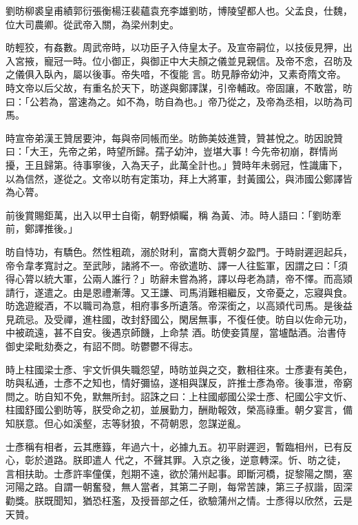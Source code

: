 
\begin{pinyinscope}

 劉昉柳裘皇甫績郭衍張衡楊汪裴蘊袁充李雄劉昉，博陵望都人也。父孟良，仕魏，位大司農卿。從武帝入關，為梁州刺史。



 昉輕狡，有姦數。周武帝時，以功臣子入侍皇太子。及宣帝嗣位，以技佞見狎，出入宮掖，寵冠一時。位小御正，與御正中大夫顏之儀並見親信。及帝不悆，召昉及之儀俱入臥內，屬以後事。帝失喑，不復能
 言。昉見靜帝幼沖，又素奇隋文帝。時文帝以后父故，有重名於天下，昉遂與鄭譯謀，引帝輔政。帝固讓，不敢當，昉曰：「公若為，當速為之。如不為，昉自為也。」帝乃從之，及帝為丞相，以昉為司馬。



 時宣帝弟漢王贊居要沖，每與帝同帳而坐。昉飾美妓進贊，贊甚悅之。昉因說贊曰：「大王，先帝之弟，時望所歸。孺子幼沖，豈堪大事！今先帝初崩，群情尚擾，王且歸第。待事寧後，入為天子，此萬全計也。」贊時年未弱冠，性識庸下，以為信然，遂從之。文帝以昉有定策功，拜上大將軍，封黃國公，與沛國公鄭譯皆為心膂。



 前後賞賜鉅萬，出入以甲士自衛，朝野傾矚，稱
 為黃、沛。時人語曰：「劉昉牽前，鄭譯推後。」



 昉自恃功，有驕色。然性粗疏，溺於財利，富商大賈朝夕盈門。于時尉遲迥起兵，帝令韋孝寬討之。至武陟，諸將不一。帝欲遣昉、譯一人往監軍，因謂之曰：「須得心膂以統大軍，公兩人誰行？」昉辭未嘗為將，譯以母老為請，帝不懌。而高熲請行，遂遣之。由是恩禮漸薄。又王謙、司馬消難相繼反，文帝憂之，忘寢與食。昉逸遊縱酒，不以職司為意，相府事多所遺落。帝深銜之，以高熲代司馬。是後益見疏忌。及受禪，進柱國，改封舒國公，閑居無事，不復任使。昉自以佐命元功，中被疏遠，甚不自安。後遇京師饑，上命禁
 酒。昉使妾賃屋，當壚酤酒。治書侍御史梁毗劾奏之，有詔不問。昉鬱鬱不得志。



 時上柱國梁士彥、宇文忻俱失職怨望，時昉並與之交，數相往來。士彥妻有美色，昉與私通，士彥不之知也，情好彌協，遂相與謀反，許推士彥為帝。後事泄，帝窮問之。昉自知不免，默無所封。詔誅之曰：上柱國郕國公梁士彥、杞國公宇文忻、柱國舒國公劉昉等，朕受命之初，並展勤力，酬勛報效，榮高祿重。朝夕宴言，備知朕意。但心如溪壑，志等豺狼，不荷朝恩，忽謀逆亂。



 士彥稱有相者，云其應籙，年過六十，必據九五。初平尉遲迥，暫臨相州，已有反心，彰於道路。朕即遣人
 代之，不聲其罪。入京之後，逆意轉深。忻、昉之徒，言相扶助。士彥許率僮僕，剋期不遠，欲於蒲州起事。即斷河橋，捉黎陽之關，塞河陽之路。自謂一朝奮發，無人當者，其第二子剛，每常苦諫，第三子叔諧，固深勸獎。朕既聞知，猶恐枉濫，及授晉部之任，欲驗蒲州之情。士彥得以欣然，云是天贊。




\end{pinyinscope}
